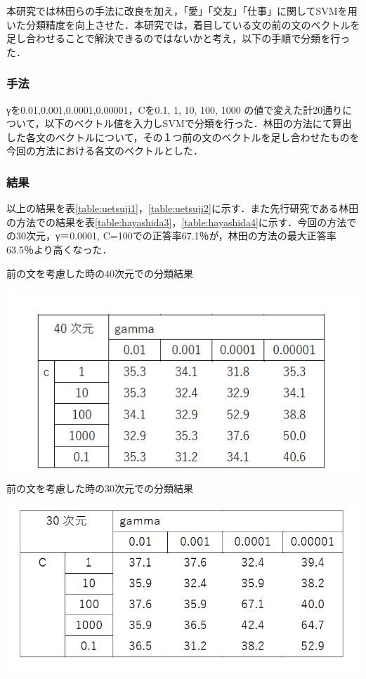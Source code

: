 \documentclass[shuuron]{kuee}
\begin{document}
本研究では林田らの手法に改良を加え，「愛」「交友」「仕事」に関してSVMを用いた分類精度を向上させた．本研究では，着目している文の前の文のベクトルを足し合わせることで解決できるのではないかと考え，以下の手順で分類を行った．

\subsubsection{手法}
γを0.01,0.001,0.0001,0.00001，Cを0.1, 1, 10, 100, 1000
の値で変えた計20通りについて，以下のベクトル値を入力しSVMで分類を行った．林田の方法にて算出した各文のベクトルについて，その１つ前の文のベクトルを足し合わせたものを今回の方法における各文のベクトルとした．

\subsubsection{結果}
以上の結果を表\ref{table:uetsuji1}，\ref{table:uetsuji2}に示す．また先行研究である林田の方法での結果を表\ref{table:hayashida3}，\ref{table:hayashida4}に示す．今回の方法での30次元，γ＝0.0001, C=100での正答率67.1％が，林田の方法の最大正答率63.5％より高くなった．

\begin{table}
  \caption{前の文を考慮した時の40次元での分類結果}
  \label{table:uetsuji1}
  \begin{center}
    \includegraphics[width=\linewidth]{uetsuji1.png}
  \end{center}
\end{table}

\begin{table}
  \caption{前の文を考慮した時の30次元での分類結果}
  \label{table:uetsuji2}
  \begin{center}
    \includegraphics[width=\linewidth]{uetsuji2.png}
  \end{center}
\end{table}
\end{document}
